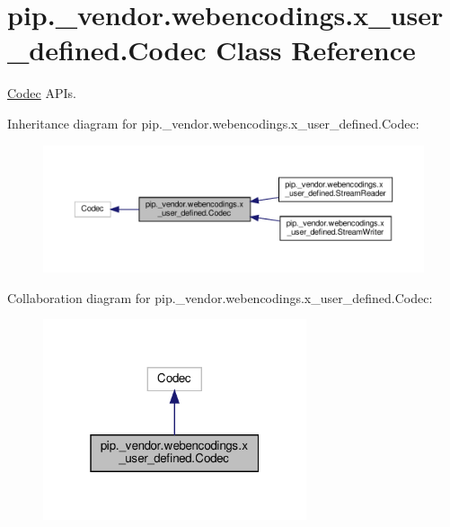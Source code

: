 \hypertarget{classpip_1_1__vendor_1_1webencodings_1_1x__user__defined_1_1Codec}{}\section{pip.\+\_\+vendor.\+webencodings.\+x\+\_\+user\+\_\+defined.\+Codec Class Reference}
\label{classpip_1_1__vendor_1_1webencodings_1_1x__user__defined_1_1Codec}


\hyperlink{classpip_1_1__vendor_1_1webencodings_1_1x__user__defined_1_1Codec}{Codec} A\+P\+Is.  




Inheritance diagram for pip.\+\_\+vendor.\+webencodings.\+x\+\_\+user\+\_\+defined.\+Codec\+:
\nopagebreak
\begin{figure}[H]
\begin{center}
\leavevmode
\includegraphics[width=350pt]{classpip_1_1__vendor_1_1webencodings_1_1x__user__defined_1_1Codec__inherit__graph}
\end{center}
\end{figure}


Collaboration diagram for pip.\+\_\+vendor.\+webencodings.\+x\+\_\+user\+\_\+defined.\+Codec\+:
\nopagebreak
\begin{figure}[H]
\begin{center}
\leavevmode
\includegraphics[width=220pt]{classpip_1_1__vendor_1_1webencodings_1_1x__user__defined_1_1Codec__coll__graph}
\end{center}
\end{figure}

